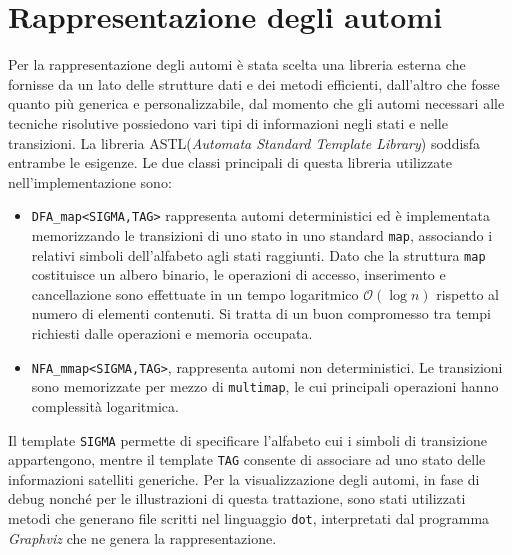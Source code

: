 \section{Rappresentazione degli automi}
Per la rappresentazione degli automi è stata scelta una libreria esterna che fornisse da un lato delle strutture dati e dei metodi efficienti, dall'altro che fosse quanto più generica e personalizzabile, dal momento che gli automi necessari alle tecniche risolutive possiedono vari tipi di informazioni negli stati e nelle transizioni. La libreria ASTL(\emph{Automata Standard Template Library})\cite{web:astl} soddisfa entrambe le esigenze. Le due classi principali di questa libreria utilizzate nell'implementazione sono:
\begin{itemize}
\item \verb|DFA_map<SIGMA,TAG>| rappresenta automi deterministici ed è implementata memorizzando le transizioni di uno stato in uno standard \verb|map|, associando i relativi simboli dell'alfabeto agli stati raggiunti. Dato che la struttura \verb|map| costituisce un albero binario, le operazioni di accesso, inserimento e cancellazione sono effettuate in un tempo logaritmico $\mathcal{O}(\log n)$ rispetto al numero di elementi contenuti.  Si tratta di un buon compromesso tra tempi richiesti dalle operazioni e memoria occupata.
\item \verb|NFA_mmap<SIGMA,TAG>|, rappresenta automi non deterministici. Le transizioni sono memorizzate per mezzo di \verb|multimap|, le cui principali operazioni hanno complessità logaritmica.
\end{itemize}
Il template \verb|SIGMA| permette di specificare l'alfabeto cui i simboli di transizione appartengono, mentre il template \verb|TAG| consente di associare ad uno stato delle informazioni satelliti generiche. 
Per la visualizzazione degli automi, in fase di debug nonché per le illustrazioni di questa trattazione, sono stati utilizzati metodi che generano file scritti nel linguaggio \verb|dot|, interpretati dal programma \emph{Graphviz}\cite{web:graphviz} che ne genera la rappresentazione.

